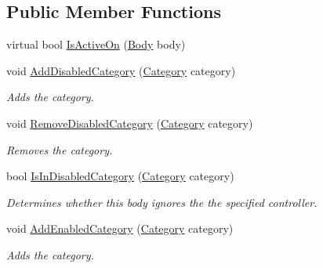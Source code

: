 \subsection*{Public Member Functions}
\begin{DoxyCompactItemize}
\item 
virtual bool \hyperlink{class_farseer_physics_1_1_common_1_1_physics_logic_1_1_filter_data_a1513f817fadd766ee29203130ec909a2}{Is\+Active\+On} (\hyperlink{class_farseer_physics_1_1_dynamics_1_1_body}{Body} body)
\item 
void \hyperlink{class_farseer_physics_1_1_common_1_1_physics_logic_1_1_filter_data_a5052d8686f473b9c770f3d9afade8568}{Add\+Disabled\+Category} (\hyperlink{namespace_farseer_physics_1_1_dynamics_a411fb391cb862402e877a2d3d4e11bef}{Category} category)
\begin{DoxyCompactList}\small\item\em Adds the category. \end{DoxyCompactList}\item 
void \hyperlink{class_farseer_physics_1_1_common_1_1_physics_logic_1_1_filter_data_a2d64cfa6e19efa80097c6a95cb88e66d}{Remove\+Disabled\+Category} (\hyperlink{namespace_farseer_physics_1_1_dynamics_a411fb391cb862402e877a2d3d4e11bef}{Category} category)
\begin{DoxyCompactList}\small\item\em Removes the category. \end{DoxyCompactList}\item 
bool \hyperlink{class_farseer_physics_1_1_common_1_1_physics_logic_1_1_filter_data_a3a6ad17292037fe543a38d146ed38a9c}{Is\+In\+Disabled\+Category} (\hyperlink{namespace_farseer_physics_1_1_dynamics_a411fb391cb862402e877a2d3d4e11bef}{Category} category)
\begin{DoxyCompactList}\small\item\em Determines whether this body ignores the the specified controller. \end{DoxyCompactList}\item 
void \hyperlink{class_farseer_physics_1_1_common_1_1_physics_logic_1_1_filter_data_a40d9f07bf96b71d92120d294f64c428c}{Add\+Enabled\+Category} (\hyperlink{namespace_farseer_physics_1_1_dynamics_a411fb391cb862402e877a2d3d4e11bef}{Category} category)
\begin{DoxyCompactList}\small\item\em Adds the category. \end{DoxyCompactList}\item 

\end{DoxyCompactItemize}

